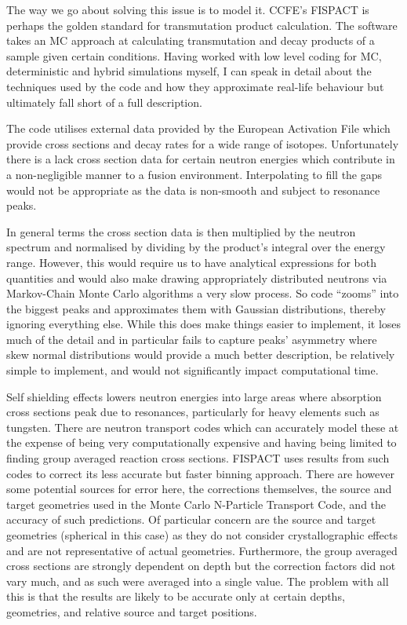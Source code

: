 \documentclass[12pt, a4paper]{article}
\begin{document}
		The way we go about solving this issue is to model it. CCFE's FISPACT is perhaps the golden standard for transmutation product calculation. The software takes an MC approach at calculating transmutation and decay products of a sample given certain conditions. Having worked with low level coding for MC, deterministic and hybrid simulations myself, I can speak in detail about the techniques used by the code and how they approximate real-life behaviour but ultimately fall short of a full description.
		
		The code utilises external data provided by the European Activation File which provide cross sections and decay rates for a wide range of isotopes. Unfortunately there is a lack cross section data for certain neutron energies which contribute in a non-negligible manner to a fusion environment. Interpolating to fill the gaps would not be appropriate as the data is non-smooth and subject to resonance peaks.
		
		In general terms the cross section data is then multiplied by the neutron spectrum and normalised by dividing by the product's integral over the energy range. However, this would require us to have analytical expressions for both quantities and would also make drawing appropriately distributed neutrons via Markov-Chain Monte Carlo algorithms a very slow process. So code ``zooms'' into the biggest peaks and approximates them with Gaussian distributions, thereby ignoring everything else. While this does make things easier to implement, it loses much of the detail and in particular fails to capture peaks' asymmetry where skew normal distributions would provide a much better description, be relatively simple to implement, and would not significantly impact computational time.
		
		Self shielding effects lowers neutron energies into large areas where absorption cross sections peak due to resonances, particularly for heavy elements such as tungsten. There are neutron transport codes which can accurately model these at the expense of being very computationally expensive and having being limited to finding group averaged reaction cross sections. FISPACT uses results from such codes to correct its less accurate but faster binning approach. There are however some potential sources for error here, the corrections themselves, the source and target geometries used in the Monte Carlo N-Particle Transport Code, and the accuracy of such predictions. Of particular concern are the source and target geometries (spherical in this case) as they do not consider crystallographic effects and are not representative of actual geometries. Furthermore, the group averaged cross sections are strongly dependent on depth but the correction factors did not vary much, and as such were averaged into a single value. The problem with all this is that the results are likely to be accurate only at certain depths, geometries, and relative source and target positions.
		
\end{document}
